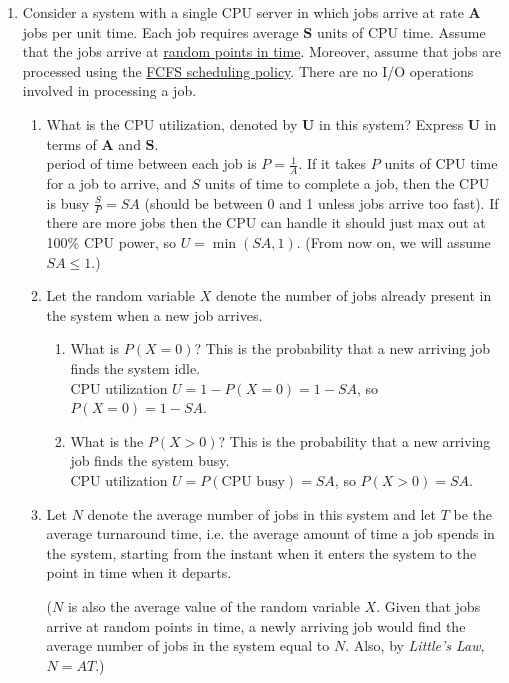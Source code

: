 \documentclass[11pt]{article}
\newcommand{\n}{\vspace{0.3cm}}
\begin{document}
\begin{enumerate}
  \item Consider a system with a single CPU server in which jobs arrive at rate \(\textbf{A}\) jobs per unit time.  Each job requires average \(\textbf{S}\) units of CPU time.  Assume that the jobs arrive at \ul{random points in time}.  Moreover, assume that jobs are processed using the \ul{FCFS scheduling policy}.  There are no I/O operations involved in processing a job.
    \begin{enumerate}
      \item What is the CPU utilization, denoted by \(\textbf{U}\) in this system?  Express \(\textbf{U}\) in terms of \(\textbf{A}\) and \(\textbf{S}\). \n\\
        period of time between each job is \(P = \frac{1}{A}\).  If it takes \(P\) units of CPU time for a job to arrive, and \(S\) units of time to complete a job, then the CPU is busy \(\frac{S}{P} = SA\) (should be between 0 and 1 unless jobs arrive too fast).  If there are more jobs then the CPU can handle it should just max out at 100\% CPU power, so \(U = \min(SA,1)\).  (From now on, we will assume \(SA \leq 1\).) \n

      \item Let the random variable \(X\) denote the number of jobs already present in the system when a new job arrives.
        \begin{enumerate}
          \item What is \(P(X=0)\)? This is the probability that a new arriving job finds the system idle. \n\\
            CPU utilization \(U = 1 - P(X=0) = 1 - SA\), so \(P(X=0) = 1 - SA\). \n

          \item What is the \(P(X>0)\)?  This is the probability that a new arriving job finds the system busy.\n\\
            CPU utilization \(U = P(\text{CPU busy}) = SA\), so \(P(X>0) = SA\). \n
        \end{enumerate}

      \item Let \(N\) denote the average number of jobs in this system and let \(T\) be the average turnaround time, i.e. the average amount of time a job spends in the system, starting from the instant when it enters the system to the point in time when it departs.  

        (\(N\) is also the average value of the random variable \(X\).  Given that jobs arrive at random points in time, a newly arriving job would find the average number of jobs in the system equal to \(N\). Also, by \textit{Little's Law}, \(N = AT\).)  


\end{enumerate}
\end{enumerate}
\end{document}
